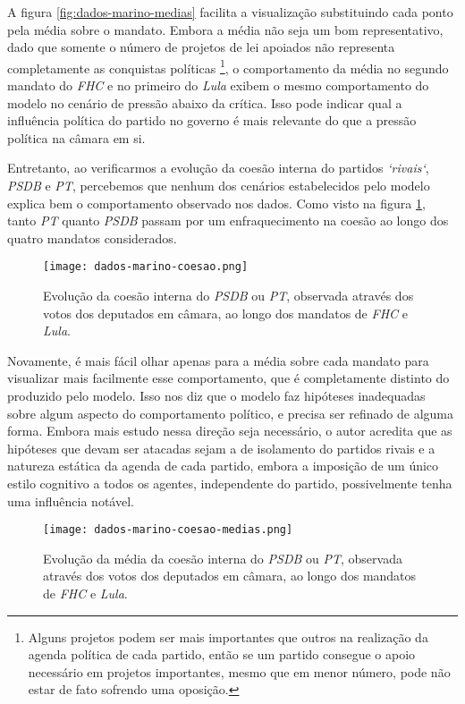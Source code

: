 A figura \ref{fig:dados-marino-medias} facilita a visualização substituindo cada ponto pela média sobre o mandato.
Embora a média não seja um bom representativo, dado que somente o número de projetos de lei apoiados não representa completamente as conquistas políticas \footnote{Alguns projetos podem ser mais importantes que outros na realização da agenda política de cada partido, então se um partido consegue o apoio necessário em projetos importantes, mesmo que em menor número, pode não estar de fato sofrendo uma oposição.}, o comportamento da média no segundo mandato do \emph{FHC} e no primeiro do \emph{Lula} exibem o mesmo comportamento do modelo no cenário de pressão abaixo da crítica.
Isso pode indicar qual a influência política do partido no governo é mais relevante do que a pressão política na câmara em si.

Entretanto, ao verificarmos a evolução da coesão interna do partidos \emph{`rivais`}, \emph{PSDB} e \emph{PT}, percebemos que nenhum dos cenários estabelecidos pelo modelo explica bem o comportamento observado nos dados.
Como visto na figura \ref{fig:dados-marino-coesao}, tanto \emph{PT} quanto \emph{PSDB} passam por um enfraquecimento na coesão ao longo dos quatro mandatos considerados.
\begin{figure}[t!]\label{fig:dados-marino-coesao}
    \centering
    \texttt{[image: dados-marino-coesao.png]}
    \caption{Evolução da coesão interna do \emph{PSDB} ou \emph{PT}, observada através dos votos dos deputados em câmara, ao longo dos mandatos de \emph{FHC} e \emph{Lula}.}
\end{figure}

Novamente, é mais fácil olhar apenas para a média sobre cada mandato para visualizar mais facilmente esse comportamento, que é completamente distinto do produzido pelo modelo.
Isso nos diz que o modelo faz hipóteses inadequadas sobre algum aspecto do comportamento político, e precisa ser refinado de alguma forma.
Embora mais estudo nessa direção seja necessário, o autor acredita que as hipóteses que devam ser atacadas sejam a de isolamento do partidos rivais e a natureza estática da agenda de cada partido, embora a imposição de um único estilo cognitivo a todos os agentes, independente do partido, possivelmente tenha uma influência notável.
\begin{figure}[t!]\label{fig:dados-marino-coesao-medias}
    \centering
    \texttt{[image: dados-marino-coesao-medias.png]}
    \caption{Evolução da média da coesão interna do \emph{PSDB} ou \emph{PT}, observada através dos votos dos deputados em câmara, ao longo dos mandatos de \emph{FHC} e \emph{Lula}.}
\end{figure}


